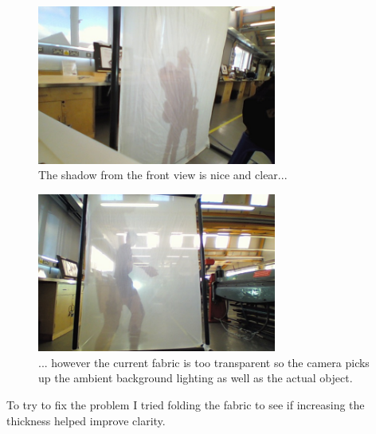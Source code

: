 \documentclass[a4paper]{article}
\begin{document}
\begin{figure}[H]
  \centering
    \includegraphics[width=0.7\textwidth]{figures/clear_shadow.jpg}
    \caption{The shadow from the front view is nice and clear...}
  \label{fig:f2}
\end{figure}

\begin{figure}[H]
  \centering
    \includegraphics[width=0.7\textwidth]{figures/rear_shadow.jpg}
    \caption{... however the current fabric is too transparent so the camera picks up the ambient background lighting as well as the actual object.}
  \label{fig:f2}
\end{figure}

To try to fix the problem I tried folding the fabric to see if increasing the thickness helped improve clarity.
\end{document}
